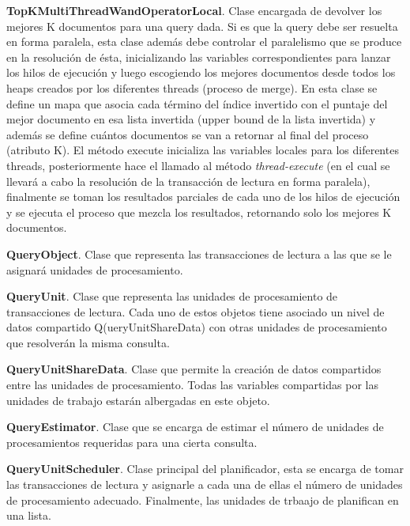 \begin{list}{}{}
	\item \textbf{TopKMultiThreadWandOperatorLocal}. Clase encargada de devolver los mejores K documentos para una query dada. Si es que la query debe ser resuelta en forma paralela, esta clase además debe controlar el paralelismo que se produce en la resolución de ésta, inicializando las variables correspondientes para lanzar los hilos de ejecución y luego escogiendo los mejores documentos desde todos los heaps creados por los diferentes threads (proceso de merge). En esta clase se define un mapa que asocia cada término del índice invertido con el puntaje del mejor documento en esa lista invertida (upper bound de la lista invertida) y además se define cuántos documentos se van a retornar al final del proceso (atributo K). El método execute inicializa las variables locales para los diferentes threads, posteriormente hace el llamado al método \emph{thread-execute} (en el cual se llevará a cabo la resolución de la transacción de lectura en forma paralela), finalmente se toman los resultados parciales de cada uno de los hilos de ejecución y se ejecuta el proceso que mezcla los resultados, retornando solo los mejores K documentos. 
	
	\item \textbf{QueryObject}. Clase que representa las transacciones de lectura a las que se le asignará unidades de procesamiento.
	
	\item \textbf{QueryUnit}. Clase que representa las unidades de procesamiento de transacciones de lectura. Cada uno de estos objetos tiene asociado un nivel de datos compartido Q(ueryUnitShareData) con otras unidades de procesamiento que resolverán la misma consulta.
			
	\item \textbf{QueryUnitShareData}. Clase que permite la creación de datos compartidos entre las unidades de procesamiento. Todas las variables compartidas por las unidades de trabajo estarán albergadas en este objeto. 
	
	\item \textbf{QueryEstimator}. Clase que se encarga de estimar el número de unidades de procesamientos requeridas para una cierta consulta.
	 
	\item \textbf{QueryUnitScheduler}. Clase principal del planificador, esta se encarga de tomar las transacciones de lectura y asignarle a cada una de ellas el número de unidades de procesamiento adecuado. Finalmente, las unidades de trbaajo de planifican en una lista.
\end{list}


